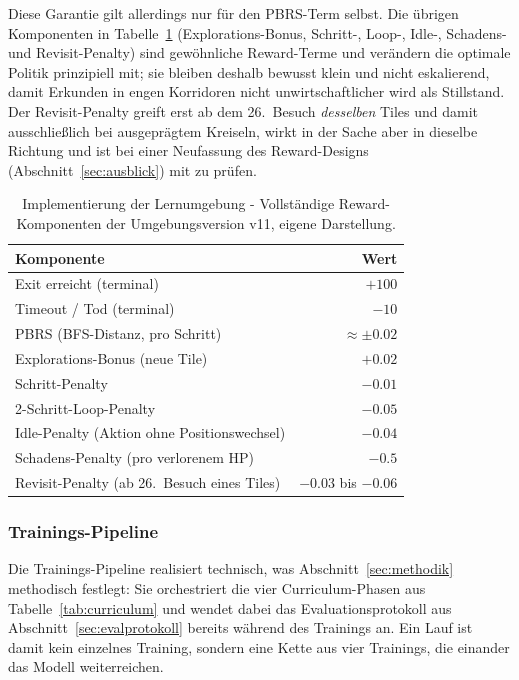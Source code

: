 \documentclass[11pt,a4paper]{article}
\begin{document}
Diese Garantie gilt allerdings nur für den PBRS-Term selbst. Die übrigen
Komponenten in Tabelle~\ref{tab:reward} (Explorations-Bonus, Schritt-, Loop-,
Idle-, Schadens- und Revisit-Penalty) sind gewöhnliche Reward-Terme und
verändern die optimale Politik prinzipiell mit; sie bleiben deshalb bewusst
klein und nicht eskalierend, damit Erkunden in engen Korridoren nicht
unwirtschaftlicher wird als Stillstand. Der Revisit-Penalty greift erst ab
dem 26.\ Besuch \emph{desselben} Tiles und damit ausschließlich bei
ausgeprägtem Kreiseln, wirkt in der Sache aber in dieselbe Richtung und ist
bei einer Neufassung des Reward-Designs (Abschnitt~\ref{sec:ausblick}) mit zu
prüfen.

\begin{table}[h]
\centering
\small
\begin{tabular}{@{}lr@{}}
\toprule
\textbf{Komponente} & \textbf{Wert} \\
\midrule
Exit erreicht (terminal) & $+100$ \\
Timeout / Tod (terminal) & $-10$ \\
PBRS (BFS-Distanz, pro Schritt) & $\approx \pm 0.02$ \\
Explorations-Bonus (neue Tile) & $+0.02$ \\
Schritt-Penalty & $-0.01$ \\
2-Schritt-Loop-Penalty & $-0.05$ \\
Idle-Penalty (Aktion ohne Positionswechsel) & $-0.04$ \\
Schadens-Penalty (pro verlorenem HP) & $-0.5$ \\
\midrule
Revisit-Penalty (ab 26.\ Besuch eines Tiles) & $-0.03$ bis $-0.06$ \\
\bottomrule
\end{tabular}
\caption[Reward-Komponenten (Env v11)]{Implementierung der Lernumgebung -
Vollständige Reward-Komponenten der Umgebungsversion v11, eigene
Darstellung.}
\label{tab:reward}
\end{table}

\subsubsection{Trainings-Pipeline}
\label{sec:trainingspipeline}

Die Trainings-Pipeline realisiert technisch, was Abschnitt~\ref{sec:methodik}
methodisch festlegt: Sie orchestriert die vier Curriculum-Phasen aus
Tabelle~\ref{tab:curriculum} und wendet dabei das Evaluationsprotokoll aus
Abschnitt~\ref{sec:evalprotokoll} bereits während des Trainings an. Ein Lauf
ist damit kein einzelnes Training, sondern eine Kette aus vier Trainings, die
einander das Modell weiterreichen.
\end{document}
